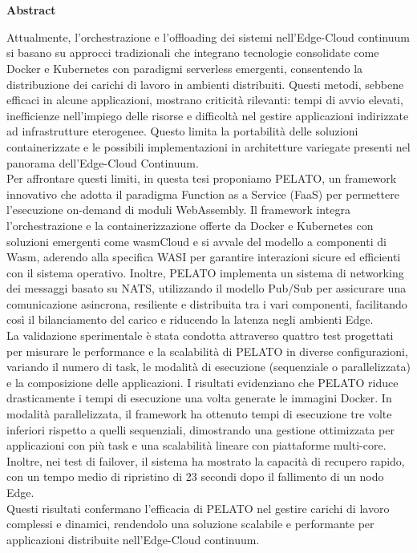 \section*{}
\begin{center}
{\Huge \textbf{Abstract}}
\vspace{15mm}
\end{center}
\thispagestyle{empty}

Attualmente, l’orchestrazione e l’offloading dei sistemi nell’Edge-Cloud continuum si basano su approcci tradizionali che integrano tecnologie consolidate come Docker e Kubernetes con paradigmi serverless emergenti, consentendo la distribuzione dei carichi di lavoro in ambienti distribuiti. Questi metodi, sebbene efficaci in alcune applicazioni, mostrano criticità rilevanti: tempi di avvio elevati, inefficienze nell’impiego delle risorse e difficoltà nel gestire applicazioni indirizzate ad infrastrutture eterogenee. Questo limita la portabilità delle soluzioni containerizzate e le possibili implementazioni in architetture variegate presenti nel panorama dell'Edge-Cloud Continuum.\\
Per affrontare questi limiti, in questa tesi proponiamo PELATO, un framework innovativo che adotta il paradigma Function as a Service (FaaS) per permettere l’esecuzione on-demand di moduli WebAssembly. Il framework integra l’orchestrazione e la containerizzazione offerte da Docker e Kubernetes con soluzioni emergenti come wasmCloud e si avvale del modello a componenti di Wasm, aderendo alla specifica WASI per garantire interazioni sicure ed efficienti con il sistema operativo. Inoltre, PELATO implementa un sistema di networking dei messaggi basato su NATS, utilizzando il modello Pub/Sub per assicurare una comunicazione asincrona, resiliente e distribuita tra i vari componenti, facilitando così il bilanciamento del carico e riducendo la latenza negli ambienti Edge.\\
La validazione sperimentale è stata condotta attraverso quattro test progettati per misurare le performance e la scalabilità di PELATO in diverse configurazioni, variando il numero di task, le modalità di esecuzione (sequenziale o parallelizzata) e la composizione delle applicazioni. I risultati evidenziano che PELATO riduce drasticamente i tempi di esecuzione una volta generate le immagini Docker. In modalità parallelizzata, il framework ha ottenuto tempi di esecuzione tre volte inferiori rispetto a quelli sequenziali, dimostrando una gestione ottimizzata per applicazioni con più task e una scalabilità lineare con piattaforme multi-core. Inoltre, nei test di failover, il sistema ha mostrato la capacità di recupero rapido, con un tempo medio di ripristino di 23 secondi dopo il fallimento di un nodo Edge.\\
Questi risultati confermano l’efficacia di PELATO nel gestire carichi di lavoro complessi e dinamici, rendendolo una soluzione scalabile e performante per applicazioni distribuite nell’Edge-Cloud continuum.